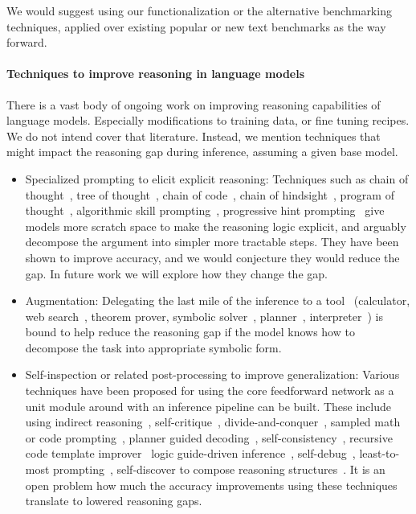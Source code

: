 \documentclass[11pt,a4paper]{article}
\begin{document}
We would suggest using our functionalization or the alternative benchmarking
techniques, applied over existing popular or new text benchmarks as the way
forward.

\paragraph{Techniques to improve reasoning in language models}
There is a vast body of ongoing work on improving reasoning capabilities of language models. Especially modifications to training data, or fine tuning recipes. We do not intend cover that literature. Instead, we mention techniques that might impact the reasoning gap during inference, assuming a given base model.
\begin{itemize}
  \item Specialized prompting to elicit explicit reasoning:
      Techniques such as chain of thought~\cite{chain-of-thought},
      tree of thought~\cite{tree-of-thought},
      chain of code~\cite{chain-of-code},
      chain of hindsight~\cite{chain-of-hindsight},
      program of thought~\cite{program-of-thought},
      algorithmic skill prompting~\cite{alg-prompting},
      progressive hint prompting~\cite{progressivehint} give models more
      scratch space to make
      the reasoning logic explicit, and arguably decompose the argument into
      simpler more tractable steps. They have been shown to improve accuracy,
      and we would conjecture they would reduce the gap. In future work we will
      explore how they change the gap.

  \item Augmentation: Delegating the last mile of the inference to a
    tool~\cite{tora, talm} (calculator, web search~\cite{react}, theorem prover,
    symbolic solver~\cite{symbolicai}, planner~\cite{llmp}, interpreter~\cite{pal}) is bound to help
    reduce the reasoning gap if the model
    knows how to decompose the task into appropriate symbolic form.

  \item Self-inspection or related post-processing to improve generalization:
    Various techniques have been proposed for using the core feedforward
    network as a unit module around with an inference pipeline can be built.
    These include using indirect reasoning~\cite{indirect-reasoner},
    self-critique~\cite{self-critique}, divide-and-conquer~\cite{dnc},
    sampled math or code prompting~\cite{math-prompter},
    planner guided decoding~\cite{code-planner-decoding},
    self-consistency~\cite{self-consistency},
    recursive code template improver~\cite{recursive-code-improver}
    logic guide-driven inference~\cite{logic-guide},
    self-debug~\cite{self-debug},
    least-to-most prompting~\cite{least-to-most},
    self-discover to compose reasoning structures~\cite{self-discover}.
    It is
    an open problem how much the accuracy improvements using these techniques
    translate to lowered reasoning gaps.

\end{itemize}
\end{document}
